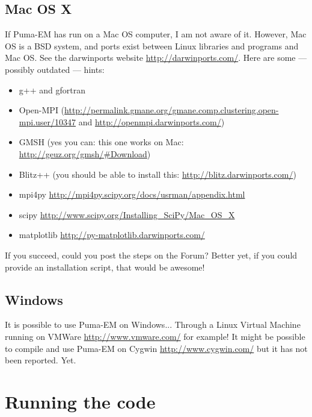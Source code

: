 \documentclass[a4paper,10pt]{book}
\begin{document}
\section{Mac OS X}
%
\par
If Puma-EM has run on a Mac OS computer, I am not aware of it. However, Mac OS is a BSD system, and ports exist between Linux libraries and programs and Mac OS. See the darwinports website \url{http://darwinports.com/}. Here are some --- possibly outdated --- hints:
\begin{itemize}
\item g++ and gfortran
\item Open-MPI (\url{http://permalink.gmane.org/gmane.comp.clustering.open-mpi.user/10347} and \url{http://openmpi.darwinports.com/})
\item GMSH (yes you can: this one works on Mac: \url{http://geuz.org/gmsh/#Download})
\item Blitz++ (you should be able to install this: \url{http://blitz.darwinports.com/})
\item mpi4py \url{http://mpi4py.scipy.org/docs/usrman/appendix.html}
\item scipy \url{http://www.scipy.org/Installing_SciPy/Mac_OS_X}
\item matplotlib \url{http://py-matplotlib.darwinports.com/}
\end{itemize}
If you succeed, could you post the steps on the Forum? Better yet, if you could provide an installation script, that would be awesome!


\section{Windows}
%
\par
It is possible to use Puma-EM on Windows... Through a Linux Virtual Machine running on VMWare \url{http://www.vmware.com/} for example! It might be possible to compile and use Puma-EM on Cygwin \url{http://www.cygwin.com/} but it has not been reported. Yet. 


\chapter{Running the code}
\end{document}
